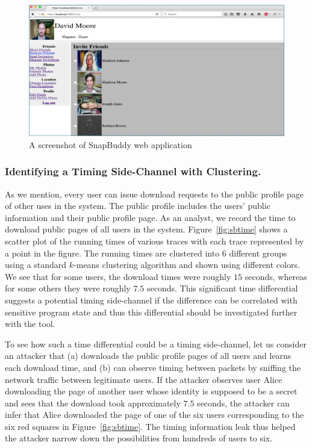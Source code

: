 \documentclass{article}
\begin{document}
\begin{figure}[t]
    \centering
    \includegraphics[width=1\textwidth]{snapbuddy-1}
    \caption{A screenshot of SnapBuddy web application}
    \label{snapbuddy-1}
\end{figure}

\subsubsection*{Identifying a Timing Side-Channel with Clustering.}
As we mention, every user can issue download requests to the
public profile page of other uses in the system. The public profile
includes the users' public information and their public profile page. 
As an analyst, we record the time to download public pages of all users
in the system. Figure~\ref{fig:sbtime} shows a scatter plot of the running times of
various traces with each trace represented by a point in the figure. The
running times are clustered into $6$ different groups using a
standard $k$-means clustering algorithm and shown using different
colors. We see that for some users, the download times were roughly $15$ seconds, whereas for
some others they were roughly $7.5$ seconds. This significant time differential suggests a
potential timing side-channel if the difference can be correlated with sensitive
program state and thus this differential should be investigated further with the tool.

To see how such a time differential could be a timing side-channel,
let us consider an attacker that
(a) downloads the public profile pages of all users and learns each download time,
and (b) can observe timing between packets by sniffing the
network traffic between legitimate users.
If the attacker observes user Alice downloading the page of another user whose identity
is supposed to be a secret
and sees that the download took approximately $7.5$ seconds, the attacker can infer
that Alice downloaded the page of one of the six users corresponding
to the six red squares in Figure~\ref{fig:sbtime}. The timing
information leak thus helped the attacker narrow down the
possibilities from hundreds of users to six.
\end{document}
